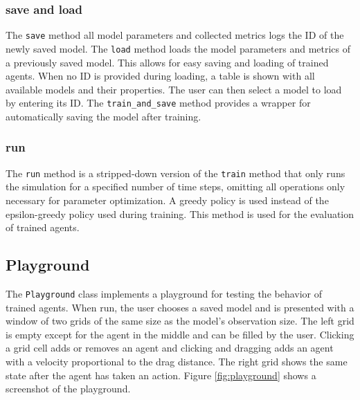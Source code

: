 \subsubsection{save and load}
The \texttt{save} method all model parameters and collected metrics logs the ID of the newly saved model. The \texttt{load} method loads the model parameters and metrics of a previously saved model. This allows for easy saving and loading of trained agents. When no ID is provided during loading, a table is shown with all available models and their properties. The user can then select a model to load by entering its ID. The \texttt{train\_and\_save} method provides a wrapper for automatically saving the model after training.

\subsubsection{run}
The \texttt{run} method is a stripped-down version of the \texttt{train} method that only runs the simulation for a specified number of time steps, omitting all operations only necessary for parameter optimization. A greedy policy is used instead of the epsilon-greedy policy used during training. This method is used for the evaluation of trained agents. 


\subsection{Playground}
\label{subsec:implementation-playground}
The \texttt{Playground} class implements a playground for testing the behavior of trained agents. When run, the user chooses a saved model and is presented with a window of two grids of the same size as the model's observation size. The left grid is empty except for the agent in the middle and can be filled by the user. Clicking a grid cell adds or removes an agent and clicking and dragging adds an agent with a velocity proportional to the drag distance. The right grid shows the same state after the agent has taken an action. Figure \ref{fig:playground} shows a screenshot of the playground.

